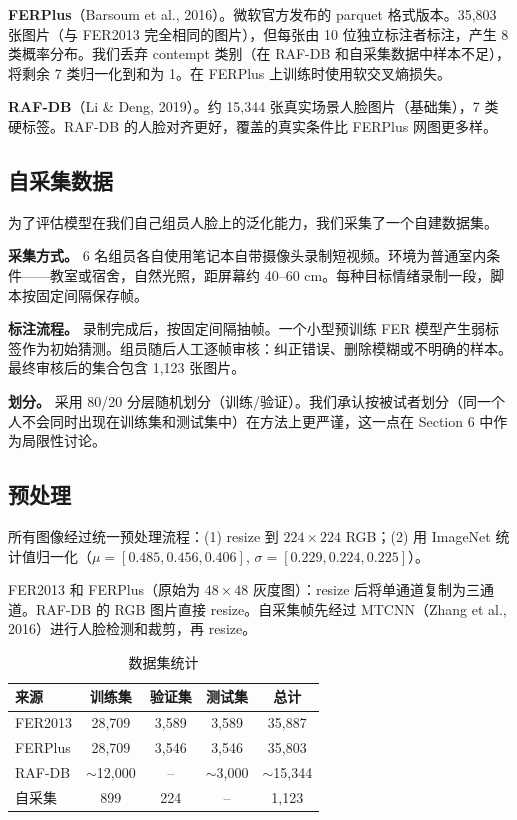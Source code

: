 \documentclass[12pt,a4paper]{ctexart}
\begin{document}
\textbf{FERPlus}（Barsoum et al., 2016）。微软官方发布的 parquet 格式版本。35,803 张图片（与 FER2013 完全相同的图片），但每张由 10 位独立标注者标注，产生 8 类概率分布。我们丢弃 contempt 类别（在 RAF-DB 和自采集数据中样本不足），将剩余 7 类归一化到和为 1。在 FERPlus 上训练时使用软交叉熵损失。

\textbf{RAF-DB}（Li \& Deng, 2019）。约 15,344 张真实场景人脸图片（基础集），7 类硬标签。RAF-DB 的人脸对齐更好，覆盖的真实条件比 FERPlus 网图更多样。

\subsection{自采集数据}

为了评估模型在我们自己组员人脸上的泛化能力，我们采集了一个自建数据集。

\textbf{采集方式。} 6 名组员各自使用笔记本自带摄像头录制短视频。环境为普通室内条件——教室或宿舍，自然光照，距屏幕约 40--60 cm。每种目标情绪录制一段，脚本按固定间隔保存帧。

\textbf{标注流程。} 录制完成后，按固定间隔抽帧。一个小型预训练 FER 模型产生弱标签作为初始猜测。组员随后人工逐帧审核：纠正错误、删除模糊或不明确的样本。最终审核后的集合包含 1,123 张图片。

\textbf{划分。} 采用 80/20 分层随机划分（训练/验证）。我们承认按被试者划分（同一个人不会同时出现在训练集和测试集中）在方法上更严谨，这一点在 Section 6 中作为局限性讨论。

\subsection{预处理}

所有图像经过统一预处理流程：(1) resize 到 $224\times224$ RGB；(2) 用 ImageNet 统计值归一化（$\mu=[0.485, 0.456, 0.406]$, $\sigma=[0.229, 0.224, 0.225]$）。

FER2013 和 FERPlus（原始为 $48\times48$ 灰度图）：resize 后将单通道复制为三通道。RAF-DB 的 RGB 图片直接 resize。自采集帧先经过 MTCNN（Zhang et al., 2016）进行人脸检测和裁剪，再 resize。

\begin{table}[H]
\centering
\caption{数据集统计}
\begin{tabular}{lcccc}
\toprule
来源 & 训练集 & 验证集 & 测试集 & 总计 \\
\midrule
FER2013 & 28,709 & 3,589 & 3,589 & 35,887 \\
FERPlus & 28,709 & 3,546 & 3,546 & 35,803 \\
RAF-DB  & $\sim$12,000 & -- & $\sim$3,000 & $\sim$15,344 \\
自采集   & 899 & 224 & -- & 1,123 \\
\bottomrule
\end{tabular}
\end{table}
\end{document}
